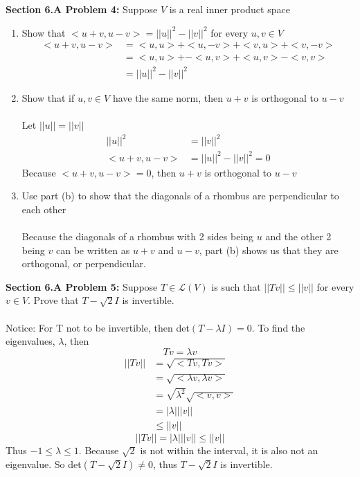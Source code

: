 \documentclass[12pt]{article}
\begin{document}
\noindent \textbf{Section 6.A Problem 4: }Suppose $V$ is a real inner product space
	\begin{enumerate}[label = (\alph*)]
		\item Show that $<u + v, u - v> = || u ||^2 - || v ||^2$ for every $u,v \in V$
		\begin{align*}
			<u + v, u - v>  &= <u,u> + <u,-v> + <v,u> + <v,-v> \\
			&= <u,u> + - <u,v> + <u,v> - <v,v> \\
			&= || u ||^2 - || v ||^2
		\end{align*}
		\item Show that if $u,v \in V$ have the same norm, then $u + v$ is orthogonal to $u - v$ \\ \\
		Let $|| u || = || v ||$
		\begin{align*}
			|| u ||^2 &= || v ||^2 \\
			<u + v, u - v> &= || u ||^2 - || v ||^2 = 0
		\end{align*}
		Because $<u + v, u - v> = 0$, then $u + v$ is orthogonal to $u - v$ \\
		\item Use part (b) to show that the diagonals of a rhombus are perpendicular to each other
		\\ \\
		Because the diagonals of a rhombus with 2 sides being $u$ and the other 2 being $v$ can be written as $u + v$ and $u - v$, part (b) shows us that they are orthogonal, or perpendicular.   
	\end{enumerate}
 
\vspace{\baselineskip}
\vspace{\baselineskip}
\vspace{\baselineskip}

\noindent \textbf{Section 6.A Problem 5: }Suppose $T \in \mathcal{L}(V)$ is such that $|| Tv || \leq || v ||$ for every $v \in V$. Prove that $T - \sqrt{2}I$ is invertible. 
\\ \\
Notice: For T not to be invertible, then det$(T - \lambda I) = 0$. To find the eigenvalues, $\lambda$, then 
	$$
	Tv = \lambda v
	$$
	\begin{align*}
		|| Tv || &= \sqrt{<Tv,Tv>} \\
		&= \sqrt{<\lambda v, \lambda v>} \\
		&= \sqrt{\lambda ^2}\sqrt{<v,v>} \\
		&= |\lambda| || v || \\
		& \leq || v ||
	\end{align*} 
	$$
	|| Tv || = |\lambda| || v || \leq || v ||
	$$
	Thus $-1 \leq \lambda \leq 1$.  Because $\sqrt{2}$ is not within the interval, it is also not an eigenvalue.  So det$(T - \sqrt{2}I) \not = 0$, thus $T - \sqrt{2}I$ is invertible.
\end{document}
